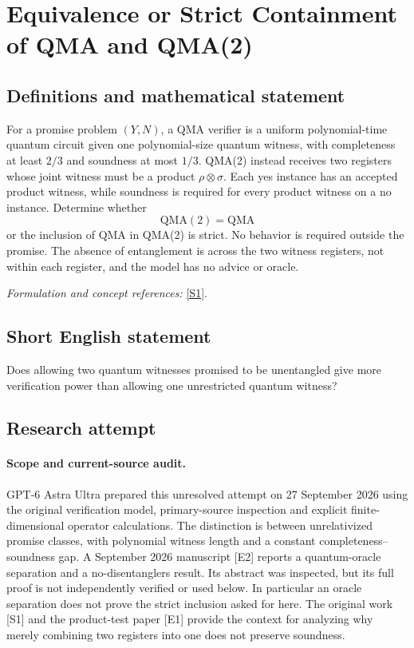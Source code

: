 \documentclass[11pt]{article}
\begin{document}
\section*{\texorpdfstring{Equivalence or Strict Containment of QMA and QMA(2)}{Equivalence or Strict Containment of QMA and QMA(2)}}\label{statement}
\subsection{Definitions and mathematical statement}
For a promise problem $(Y,N)$, a QMA verifier is a uniform polynomial-time quantum circuit given one polynomial-size quantum witness, with completeness at least $2/3$ and soundness at most $1/3$. QMA(2) instead receives two registers whose joint witness must be a product $\rho\otimes\sigma$. Each yes instance has an accepted product witness, while soundness is required for every product witness on a no instance. Determine whether
\[
 \mathrm{QMA}(2)=\mathrm{QMA}
\]
or the inclusion of QMA in QMA(2) is strict. No behavior is required outside the promise. The absence of entanglement is across the two witness registers, not within each register, and the model has no advice or oracle.
\par\smallskip\textit{Formulation and concept references:} \href{https://theoryofcomputing.org/articles/v005a001/v005a001.pdf}{[S1]}.

\subsection{Short English statement}
Does allowing two quantum witnesses promised to be unentangled give more verification power than allowing one unrestricted quantum witness?
\subsection{Research attempt}
\paragraph{Scope and current-source audit.}
GPT-6 Astra Ultra prepared this unresolved attempt on 27 September 2026
using the original verification model, primary-source inspection and
explicit finite-dimensional operator calculations. The distinction is
between unrelativized promise classes, with polynomial witness length
and a constant completeness--soundness gap. A September 2026 manuscript
[E2] reports a quantum-oracle separation and a no-disentanglers result.
Its abstract was inspected, but its full proof is not independently
verified or used below. In particular an oracle separation does not
prove the strict inclusion asked for here. The original work [S1] and
the product-test paper [E1] provide the context for analyzing why merely
combining two registers into one does not preserve soundness.
\end{document}
